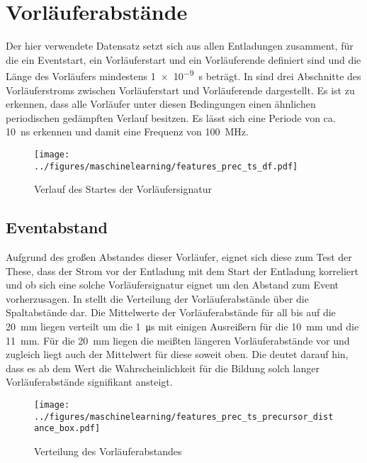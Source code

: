 \section{Vorläuferabstände}
\label{sec:precursor}
Der hier verwendete Datensatz setzt sich aus allen Entladungen zusamment, für die ein Eventstart, ein Vorläuferstart und ein Vorläuferende definiert sind und die Länge des Vorläufers mindestens \SI{1e-9}{\s} beträgt. In  sind drei Abschnitte des Vorläuferstroms zwischen Vorläuferstart und Vorläuferende dargestellt. Es ist zu erkennen, dass alle Vorläufer unter diesen Bedingungen einen ähnlichen periodischen gedämpften Verlauf besitzen. Es lässt sich eine Periode von ca. \SI{10}{\nano\second} erkennen und damit eine Frequenz von \SI{100}{\mega\hertz}. 

\begin{figure}[htbp]
    \centering
      \texttt{[image: ../figures/maschinelearning/features\_prec\_ts\_df.pdf]}
      \caption{Verlauf des Startes der Vorläufersignatur}
      \label{fig:precursor_current_sliece}
\end{figure}

\subsection{Eventabstand}
Aufgrund des großen Abstandes dieser Vorläufer, eignet sich diese zum Test der These, dass der Strom vor der Entladung mit dem Start der Entladung korreliert und ob sich eine solche Vorläufersignatur eignet um den Abstand zum Event vorherzusagen. In  stellt die Verteilung der Vorläuferabstände über die Spaltabstände dar. Die Mittelwerte der Vorläuferabstände für all bis auf die \SI{20}{\milli\meter} liegen verteilt um die \SI{1}{\micro\second} mit einigen Ausreißern für die \SI{10}{\milli\meter} und die \SI{11}{\milli\meter}. Für die \SI{20}{\milli\meter} liegen die meißten längeren Vorläuferabstände vor und zugleich liegt auch der Mittelwert für diese soweit oben. Die deutet darauf hin, dass es ab dem Wert die Wahrscheinlichkeit für die Bildung solch langer Vorläuferabstände signifikant ansteigt.

\begin{figure}[htbp]
    \centering
      \texttt{[image: ../figures/maschinelearning/features\_prec\_ts\_precursor\_distance\_box.pdf]}
      \caption{Verteilung des Vorläuferabstandes}
      \label{fig:prec_ts_prec_distance_box}
\end{figure}

